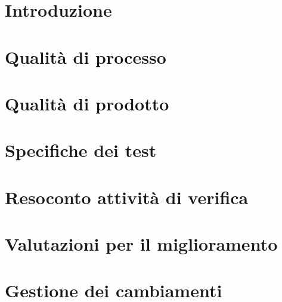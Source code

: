 \documentclass{article}
\begin{document}


\newpage
\section{Introduzione}%
\label{sec:introduzione}


\newpage
\section{Qualità di processo}%
\label{sec:qualita_di_processo}


\newpage
\section{Qualità di prodotto}%
\label{sec:qualita_di_prodotto}


\newpage
\section{Specifiche dei test}%
\label{sec:qualita_di_prodotto}


\appendix
\newpage
\section{Resoconto attività di verifica}
\label{sec:resoconto_attivita_di_verifica}


\newpage
\section{Valutazioni per il miglioramento}
\label{sec:valutazioni_per_il_miglioramento}


\newpage
\section{Gestione dei cambiamenti}
\label{sec:gestione_dei_cambiamenti}

\end{document}
